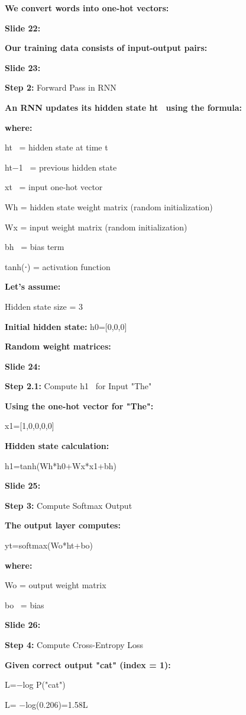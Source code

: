\documentclass[11pt,a4paper]{article}
\begin{document}
\textbf{We convert words into one-hot vectors:} 

\textbf{Slide 22:}

\textbf{Our training data consists of input-output pairs:} 

\textbf{Slide 23:}

\textbf{Step 2:}  Forward Pass in RNN

\textbf{An RNN updates its hidden state ht  using the formula:} 

\textbf{where:} 

ht  = hidden state at time t

ht−1  = previous hidden state

xt  = input one-hot vector

Wh = hidden state weight matrix (random initialization)

Wx = input weight matrix (random initialization)

bh  = bias term

tanh⁡(⋅) = activation function

\textbf{Let's assume:} 

Hidden state size = 3

\textbf{Initial hidden state:}  h0=[0,0,0]

\textbf{Random weight matrices:} 

\textbf{Slide 24:}

\textbf{Step 2.1:}  Compute h1  for Input "The"

\textbf{Using the one-hot vector for "The":} 

x1=[1,0,0,0,0]

\textbf{Hidden state calculation:} 

h1=tanh⁡(Wh*h0+Wx*x1+bh)

\textbf{Slide 25:}

\textbf{Step 3:}  Compute Softmax Output

\textbf{The output layer computes:} 

yt=softmax(Wo*ht+bo)

\textbf{where:} 

Wo = output weight matrix

bo  = bias

\textbf{Slide 26:}

\textbf{Step 4:}  Compute Cross-Entropy Loss

\textbf{Given correct output "cat" (index = 1):} 

L=−log P("cat")

L= −log(0.206)=1.58L
\end{document}
